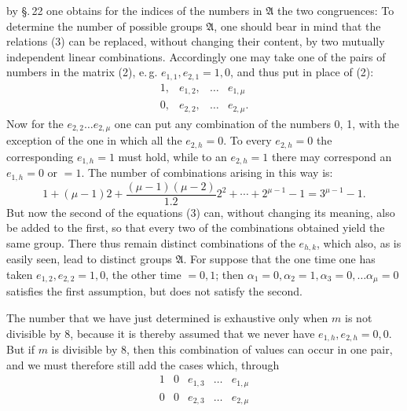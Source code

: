 by \S.\,22 one obtains for the indices of the numbers in $\mathfrak{A}$ the two congruences:
To determine the number of possible groups $\mathfrak{A}$, one should bear in mind that the relations (3) can be replaced, without changing their content, by two mutually independent linear combinations. Accordingly one may take one of the pairs of numbers in the matrix (2), e.\,g. $e_{1,1}, e_{2,1} = 1, 0$, and thus put in place of (2):
\[
\begin{array}{cccc}
1, & e_{1,2}, & \ldots & e_{1,\mu}\\
0, & e_{2,2}, & \ldots & e_{2,\mu}.
\end{array}
\]
Now for the $e_{2,2} \ldots e_{2,\mu}$ one can put any combination of the numbers 0, 1, with the exception of the one in which all the $e_{2,h} = 0$. To every $e_{2,h} = 0$ the corresponding $e_{1,h} = 1$ must hold, while to an $e_{2,h} = 1$ there may correspond an $e_{1,h} = 0$ or $= 1$. The number of combinations arising in this way is:
\[
1 + (\mu - 1)2 + \frac{(\mu - 1)(\mu - 2)}{1.2} 2^2 + \cdots + 2^{\mu - 1} - 1 = 3^{\mu - 1} - 1.
\]
But now the second of the equations (3) can, without changing its meaning, also be added to the first, so that every two of the combinations obtained yield the same group. There thus remain
distinct combinations of the $e_{h,k}$, which also, as is easily seen, lead to distinct groups $\mathfrak{A}$. For suppose that the one time one has taken $e_{1,2}, e_{2,2} = 1, 0$, the other time $= 0, 1$; then $\alpha_1 = 0, \alpha_2 = 1, \alpha_3 = 0, \ldots \alpha_\mu = 0$ satisfies the first assumption, but does not satisfy the second. %

The number that we have just determined is exhaustive only when $m$ is not divisible by 8, because it is thereby assumed that we never have $e_{1,h}, e_{2,h} = 0, 0$. But if $m$ is divisible by 8, then this combination of values can occur in one pair, and we must therefore still add the cases which, through
\[
\begin{array}{ccccc}
1 & 0 & e_{1,3} & \ldots & e_{1,\mu}\\
0 & 0 & e_{2,3} & \ldots & e_{2,\mu}
\end{array}
\]
